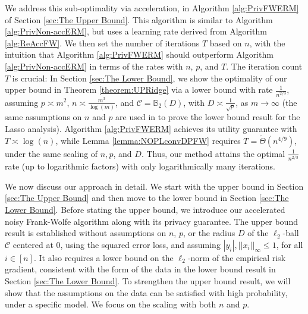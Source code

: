 \documentclass{article}
\begin{document}
We address this sub-optimality via acceleration, in Algorithm \ref{alg:PrivFWERM} of Section \ref{sec:The Upper Bound}. This algorithm is similar to Algorithm \ref{alg:PrivNon-accERM}, but uses a learning rate derived from Algorithm \ref{alg:ReAccFW}.
We then set the number of iterations $T$ based on $n$, with the intuition that Algorithm \ref{alg:PrivFWERM} should outperform Algorithm \ref{alg:PrivNon-accERM} in terms of the rates with $n$, $p$, and $T$. 
The iteration count $T$ is crucial: In Section \ref{sec:The Lower Bound}, we show the optimality of our upper bound in Theorem \ref{theorem:UPRidge} via a lower bound with rate $\frac{1}{n^{2/3}}$, assuming $p \asymp m^2$, $n \asymp \frac{m^3}{\log(m)}$, and $\mathcal{C} = \mathbb{B}_2(D)$, with $D \asymp \frac{1}{\sqrt{p}}$, as $m \rightarrow \infty$ (the same assumptions on $n$ and $p$ are used in \cite{NOPL} to prove the lower bound result for the Lasso analysis). Algorithm \ref{alg:PrivFWERM} achieves its utility guarantee with $T \asymp \log(n)$, while Lemma \ref{lemma:NOPLconvDPFW} requires $T = \widetilde{\Theta}(n^{4/9})$, under the same scaling of $n, p$, and $D$. Thus, our method attains the optimal $\frac{1}{n^{2/3}}$ rate (up to logarithmic factors) with only logarithmically many iterations.

We now discuss our approach in detail. We start with the upper bound in Section \ref{sec:The Upper Bound} and then move to the lower bound in Section \ref{sec:The Lower Bound}. Before stating the upper bound, we introduce our accelerated noisy Frank-Wolfe algorithm along with its privacy guarantee. The upper bound result is established without assumptions on $n$, $p$, or the radius $D$ of the $\ell_2$-ball $\mathcal{C}$ centered at $0$, using the squared error loss, and assuming $|y_i|, ||x_i||_\infty \leq 1$, for all $i \in [n]$. It also requires a lower bound on the $\ell_2$-norm of the empirical risk gradient, consistent with the form of the data in the lower bound result in Section \ref{sec:The Lower Bound}. To strengthen the upper bound result, we will show that the assumptions on the data can be satisfied with high probability, under a specific model. We focus on the scaling with both $n$ and $p$.
\end{document}
